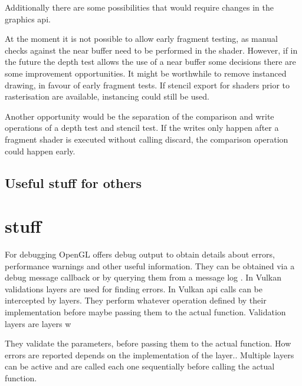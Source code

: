 Additionally there are some possibilities that would require changes in the graphics \gls{api}.

At the moment it is not possible to allow early fragment testing, as manual checks against the near buffer need to be performed in the shader. However, if in the future the depth test allows the use of a near buffer some decisions there are some improvement opportunities. It might be worthwhile to remove instanced drawing, in favour of early fragment tests. If stencil export for shaders prior to rasterisation are available, instancing could still be used.

Another opportunity would be the separation of the comparison and write operations of a depth test and stencil test. If the writes only happen after a fragment shader is executed without calling discard, the comparison operation could happen early.
\subsection{Useful stuff for others}

\section*{stuff}
For debugging OpenGL offers debug output to obtain details about errors, performance warnings and other useful information. They can be obtained via a debug message callback or by querying them from a message log \cite{khronos:openGL:spec4.6}. In Vulkan validations layers are used for finding errors. In Vulkan \gls{api} calls can be intercepted by layers. They perform whatever operation defined by their implementation before maybe passing them to the actual function. Validation layers are layers w

They validate the parameters, before passing them to the actual function. How errors are reported depends on the implementation of the layer.. Multiple layers can be active and are called each one sequentially before calling the actual function. \cite{khronos:vulkan:spec1.1}












